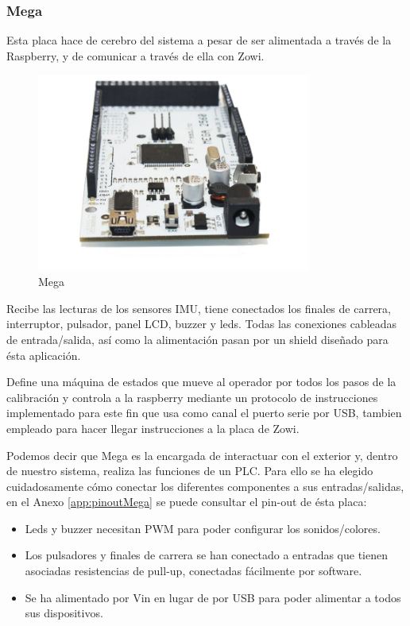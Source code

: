 \subsubsection{Mega}
Esta placa hace de cerebro del sistema a pesar de ser alimentada a través de la Raspberry, y de comunicar a través de ella con Zowi.

\begin{figure}
\centering
\includegraphics[width=90mm]{Figures/arduinoMega}
\caption{Mega}
\label{fig:arduinoMega}
\end{figure}

Recibe las lecturas de los sensores IMU, tiene conectados los finales de carrera, interruptor, pulsador, panel LCD, buzzer y leds. Todas las conexiones cableadas de entrada/salida, así como la alimentación pasan por un shield diseñado para ésta aplicación.

Define una máquina de estados que mueve al operador por todos los pasos de la calibración y controla a la raspberry mediante un protocolo de instrucciones implementado para este fin que usa como canal el puerto serie por USB, tambien empleado para hacer llegar instrucciones a la placa de Zowi.

Podemos decir que Mega es la encargada de interactuar con el exterior y, dentro de nuestro sistema, realiza las funciones de un PLC. Para ello se ha elegido cuidadosamente cómo conectar los diferentes componentes a sus entradas/salidas, en el Anexo \ref{app:pinoutMega} se puede consultar el pin-out de ésta placa:
\begin{itemize}
  \item Leds y buzzer necesitan PWM para poder configurar los sonidos/colores.
  \item Los pulsadores y finales de carrera se han conectado a entradas que tienen asociadas resistencias de pull-up, conectadas fácilmente por software.
  \item Se ha alimentado por Vin en lugar de por USB para poder alimentar a todos sus dispositivos.
\end{itemize}

